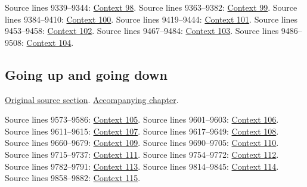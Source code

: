 \begin{AlgebraSourceRoutes}
 Source lines 9339--9344: \hyperlink{algebra-context-098}{Context 98}.
 Source lines 9363--9382: \hyperlink{algebra-context-099}{Context 99}.
 Source lines 9384--9410: \hyperlink{algebra-context-100}{Context 100}.
 Source lines 9419--9444: \hyperlink{algebra-context-101}{Context 101}.
 Source lines 9453--9458: \hyperlink{algebra-context-102}{Context 102}.
 Source lines 9467--9484: \hyperlink{algebra-context-103}{Context 103}.
 Source lines 9486--9508: \hyperlink{algebra-context-104}{Context 104}.
\end{AlgebraSourceRoutes}

\subsection{Going up and going down}
\hypertarget{algebra-source-section-going-up}{}
\noindent\href{https://github.com/stacks/stacks-project/blob/a04446e57ec1fbc252a871afcec7752fb2807b14/algebra.tex\#L9514}{Original source section}. \href{algebra.pdf\#nameddest=section-going-up}{Accompanying chapter}.

\begin{AlgebraSourceRoutes}
 Source lines 9573--9586: \hyperlink{algebra-context-105}{Context 105}.
 Source lines 9601--9603: \hyperlink{algebra-context-106}{Context 106}.
 Source lines 9611--9615: \hyperlink{algebra-context-107}{Context 107}.
 Source lines 9617--9649: \hyperlink{algebra-context-108}{Context 108}.
 Source lines 9660--9679: \hyperlink{algebra-context-109}{Context 109}.
 Source lines 9690--9705: \hyperlink{algebra-context-110}{Context 110}.
 Source lines 9715--9737: \hyperlink{algebra-context-111}{Context 111}.
 Source lines 9754--9772: \hyperlink{algebra-context-112}{Context 112}.
 Source lines 9782--9791: \hyperlink{algebra-context-113}{Context 113}.
 Source lines 9814--9845: \hyperlink{algebra-context-114}{Context 114}.
 Source lines 9858--9882: \hyperlink{algebra-context-115}{Context 115}.
\end{AlgebraSourceRoutes}

